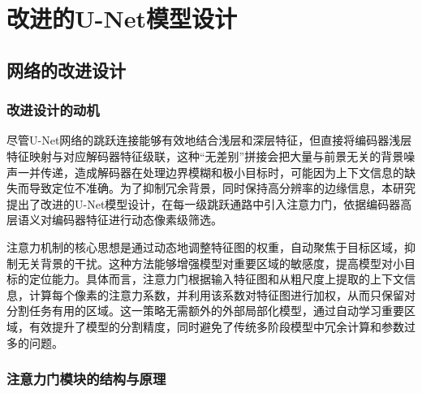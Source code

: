 \section{改进的U-Net模型设计}


\subsection{网络的改进设计}

\subsubsection{改进设计的动机}

尽管U-Net网络的跳跃连接能够有效地结合浅层和深层特征，但直接将编码器浅层特征映射与对应解码器特征级联，这种“无差别”拼接会把大量与前景无关的背景噪声一并传递，造成解码器在处理边界模糊和极小目标时，可能因为上下文信息的缺失而导致定位不准确。为了抑制冗余背景，同时保持高分辨率的边缘信息，本研究提出了改进的U-Net模型设计，在每一级跳跃通路中引入注意力门，依据编码器高层语义对编码器特征进行动态像素级筛选。

注意力机制的核心思想是通过动态地调整特征图的权重，自动聚焦于目标区域，抑制无关背景的干扰。这种方法能够增强模型对重要区域的敏感度，提高模型对小目标的定位能力\cite{oktay2018}。具体而言，注意力门根据输入特征图和从粗尺度上提取的上下文信息，计算每个像素的注意力系数，并利用该系数对特征图进行加权，从而只保留对分割任务有用的区域。这一策略无需额外的外部局部化模型，通过自动学习重要区域，有效提升了模型的分割精度，同时避免了传统多阶段模型中冗余计算和参数过多的问题。


\subsubsection{注意力门模块的结构与原理}


